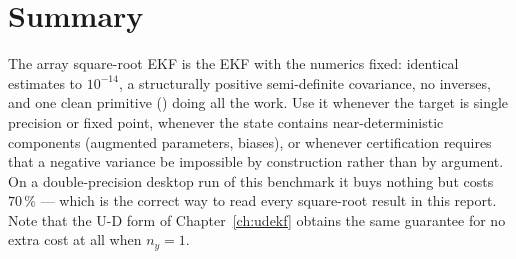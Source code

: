 \section{Summary}
The array square-root EKF is the EKF with the numerics fixed: identical estimates to
$10^{-14}$, a structurally positive semi-definite covariance, no inverses, and one clean
primitive () doing all the work. Use it whenever the target is single precision or
fixed point, whenever the state contains near-deterministic components (augmented parameters,
biases), or whenever certification requires that a negative variance be impossible by
construction rather than by argument. On a double-precision desktop run of this benchmark it
buys nothing but costs $70\,\%$ --- which is the correct way to read every square-root result
in this report. Note that the U-D form of Chapter~\ref{ch:udekf} obtains the same guarantee for
no extra cost at all when $n_y = 1$.
